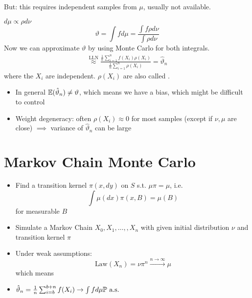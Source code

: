 But: this requires independent samples from \(\mu\), usually not available.

 \(d\mu\propto \rho d\nu\)
\[\vartheta=\int fd\mu=\frac{\int f\rho d\nu}{\int\rho d\nu}\]
Now we can approximate \(\vartheta\) by using Monte Carlo for both integrals.
\begin{eqnarray*}
    \stackrel{\text{LLN}}{\approx}\frac{\frac{1}{n}\sum_{i=1}^n f(X_i)\rho(X_i)}{\frac{1}{n}\sum_{i=1}^n \rho(X_i)}=\hat{\vartheta}_n
\end{eqnarray*}
where the \(X_i\) are independent. 
\(\rho(X_i)\) are also called .

\begin{itemize}
    \item In general \(\mathbb{E}(\hat{\vartheta}_n)\neq\vartheta\), which means we have a bias, which might be difficult to control
    \item Weight degeneracy: often \(\rho(X_i)\approx 0\) for most samples (except if \(\nu,\mu\) are close) \(\implies\) variance of \(\hat{\vartheta}_n\) can be large 
\end{itemize}

\section{Markov Chain Monte Carlo}

\begin{itemize}
    \item Find a transition kernel \(\pi(x,dy)\) on \(S\) s.t. \(\mu\pi=\mu\), i.e. 
    \begin{equation}\label{eq:mcmc_invariance}\int \mu(dx)\pi(x,B)=\mu(B)\end{equation} for measurable \(B\)
    \item Simulate a Markov Chain \(X_0,X_1,\dots,,X_n\) with given initial distribution \(\nu\) and transition kernel \(\pi\)
    \item Under weak assumptions: \[\text{Law}(X_n)=\nu\pi^n\stackrel{n\to\infty}{\to} \mu\] which means 
    \item  {} \(\hat{\vartheta}_n = \frac{1}{n}\sum_{i=b}^{b+n} f(X_i)\to\int fd\mu \mathbb{P}\text{ a.s. }\) 
\end{itemize}

